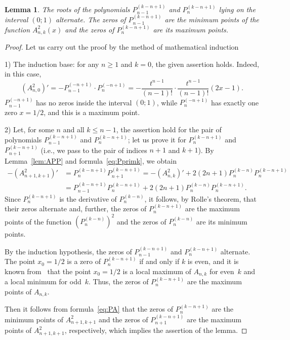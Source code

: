 \documentclass[12pt,oneside]{amsproc}
\numberwithin{equation}{section}
\newtheorem{lem}{Lemma}[section]
\begin{document}
\begin{lem}
\label{lem:zeroes}
 The roots of the polynomials
$P_{n-1}^{(k-n+1)}$
and
$P_{n}^{(k-n+1)}$
lying
on the interval
$(0;1)$
alternate.
 The zeros of
$P_{n-1}^{(k-n+1)}$
are the minimum points of the function
$A^2_{n,k}(x)$
and
the zeros of
$P_{n}^{(k-n+1)}$
are its maximum points.
\end{lem}
\begin{proof}
 Let us carry out the proof by the method of mathematical induction

1)
 The induction base:
for any
$n\geqslant 1$
and
$k=0$,
the given assertion holds.
 Indeed,
in this case,
$$
(A^2_{n,0})'=-P_{n-1}^{(-n+1)}\cdot P_{n}^{(-n+1)}=-\dfrac{t^{n-1}}{(n-1)!}\cdot
\dfrac{t^{n-1}}{(n-1)!}(2x-1).
$$
$P_{n-1}^{(-n+1)}$
has no zeros inside the interval
$(0;1)$,
while
$P_{n}^{(-n+1)}$
has exactly one zero
$x=1/2$,
and this is a maximum point.

2) Let,
for
some
$n$
and all
$k\leqslant n-1$,
the assertion hold
for the pair of polynomials
$P_{n-1}^{(k-n+1)}$
and
$P_{n}^{(k-n+1)}$;
let us prove it
for
$P_{n}^{(k-n+1)}$
and
$P_{n+1}^{(k-n+1)}$
(i.e., we pass to the pair of indices
$n+1$
and
$k+1$).
 By Lemma~\eqref{lem:APP} and formula~\eqref{eq:Pprimk},
we obtain
\begin{align*}
-(A^2_{n+1,k+1})'&= P_{n}^{(k-n+1)} P_{n+1}^{(k-n+1)}= -(A^2_{n,k})'+2(2n+1) P_{n}^{(k-n)}
P_{n}^{(k-n+1)}\\
&= P_{n-1}^{(k-n+1)} P_{n}^{(k-n+1)} + 2(2n+1) P_{n}^{(k-n)} P_{n}^{(k-n+1)}.
\end{align*}
 Since $P_{n}^{(k-n+1)}$
is the derivative of $P_{n}^{(k-n)}$,
it follows,
by Rolle's theorem,
that their zeros alternate and, further,
the zeros of
$P_{n}^{(k-n+1)}$
are the maximum points of the function
$(P_{n}^{(k-n)})^2$
and the zeros of
$P_{n}^{(k-n)}$
are its minimum points.

 By the induction hypothesis,
the zeros of
$P_{n-1}^{(k-n+1)}$
and
$P_{n}^{(k-n+1)}$
alternate.
 The point
$x_0 = {1}/{2}$
is
a zero of
$P_{n}^{(k-n+1)}$
if and only if
$k$
is even,
and
it is known from~\cite{NazM} that the point
$x_0 = {1}/{2}$
is a local maximum of
$A_{n,k}$
for even~$k$
and a local minimum
for odd~$k$.
 Thus, the zeros of
$P_{n}^{(k-n+1)}$
are the maximum points of
$A_{n,k}$.

 Then
it follows from formula~\eqref{eq:PA}
that the zeros of
$P_{n}^{(k-n+1)}$
are the minimum points of
$A^2_{n+1,k+1}$
and the zeros of
$P_{n+1}^{(k-n+1)}$
are the maximum points of
$A^2_{n+1,k+1}$,
respectively,
which implies the assertion of the lemma.
\end{proof}
\end{document}
